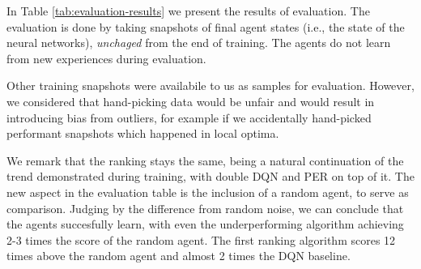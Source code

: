 In Table \ref{tab:evaluation-results} we present the results of evaluation.
The evaluation is done by taking snapshots of final agent states (i.e., the state of the neural networks), \emph{unchaged} from the end of training.
The agents do not learn from new experiences during evaluation.

Other training snapshots were availabile to us as samples for evaluation.
However, we considered that hand-picking data would be unfair and would result in introducing bias from outliers, for example if we accidentally hand-picked performant snapshots which happened in local optima.

We remark that the ranking stays the same, being a natural continuation of the trend demonstrated during training, with double DQN and PER on top of it.
The new aspect in the evaluation table is the inclusion of a random agent, to serve as comparison.
Judging by the difference from random noise, we can conclude that the agents succesfully learn, with even the underperforming algorithm achieving  2-3 times the score of the random agent. The first ranking algorithm scores 12 times above the random agent and almost 2 times the DQN baseline.